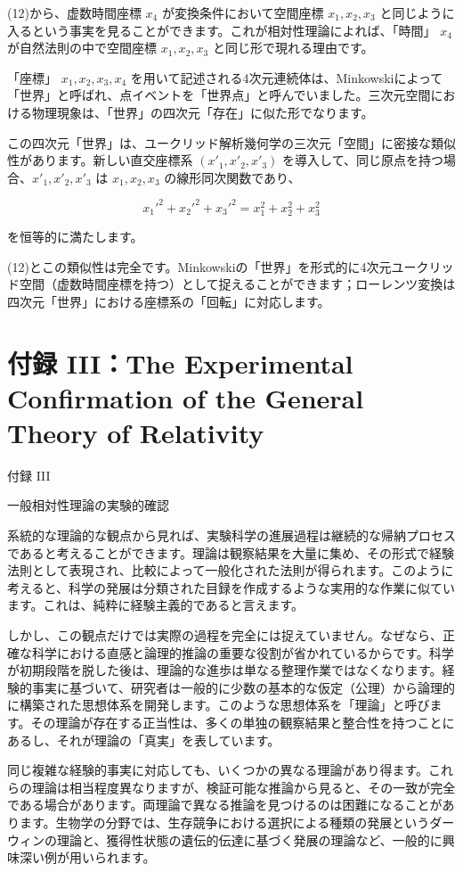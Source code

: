 \documentclass[a4paper,11pt,openany]{ltjsbook}
\begin{document}
(12)から、虚数時間座標 \(x_4\) が変換条件において空間座標 \(x_1, x_2, x_3\) と同じように入るという事実を見ることができます。これが相対性理論によれば、「時間」 \(x_4\) が自然法則の中で空間座標 \(x_1, x_2, x_3\) と同じ形で現れる理由です。

「座標」 \(x_1, x_2, x_3, x_4\) を用いて記述される4次元連続体は、Minkowskiによって「世界」と呼ばれ、点イベントを「世界点」と呼んでいました。三次元空間における物理現象は、「世界」の四次元「存在」に似た形でなります。

この四次元「世界」は、ユークリッド解析幾何学の三次元「空間」に密接な類似性があります。新しい直交座標系 \((x'_1, x'_2, x'_3)\) を導入して、同じ原点を持つ場合、\(x'_1, x'_2, x'_3\) は \(x_1, x_2, x_3\) の線形同次関数であり、

\[
x_1'^2 + x_2'^2 + x_3'^2 = x_1^2 + x_2^2 + x_3^2
\]

を恒等的に満たします。

(12)とこの類似性は完全です。Minkowskiの「世界」を形式的に4次元ユークリッド空間（虚数時間座標を持つ）として捉えることができます；ローレンツ変換は四次元「世界」における座標系の「回転」に対応します。


\clearpage
\chapter{付録 III：The Experimental Confirmation of the General Theory of Relativity}

付録 III

一般相対性理論の実験的確認

系統的な理論的な観点から見れば、実験科学の進展過程は継続的な帰納プロセスであると考えることができます。理論は観察結果を大量に集め、その形式で経験法則として表現され、比較によって一般化された法則が得られます。このように考えると、科学の発展は分類された目録を作成するような実用的な作業に似ています。これは、純粋に経験主義的であると言えます。

しかし、この観点だけでは実際の過程を完全には捉えていません。なぜなら、正確な科学における直感と論理的推論の重要な役割が省かれているからです。科学が初期段階を脱した後は、理論的な進歩は単なる整理作業ではなくなります。経験的事実に基づいて、研究者は一般的に少数の基本的な仮定（公理）から論理的に構築された思想体系を開発します。このような思想体系を「理論」と呼びます。その理論が存在する正当性は、多くの単独の観察結果と整合性を持つことにあるし、それが理論の「真実」を表しています。

同じ複雑な経験的事実に対応しても、いくつかの異なる理論があり得ます。これらの理論は相当程度異なりますが、検証可能な推論から見ると、その一致が完全である場合があります。両理論で異なる推論を見つけるのは困難になることがあります。生物学の分野では、生存競争における選択による種類の発展というダーウィンの理論と、獲得性状態の遺伝的伝達に基づく発展の理論など、一般的に興味深い例が用いられます。
\end{document}
